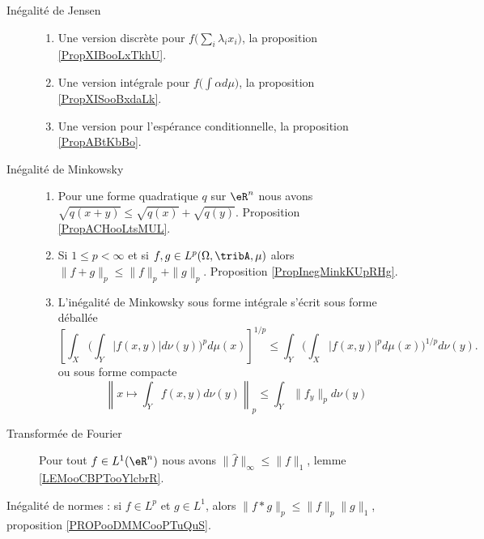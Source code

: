 \begin{description}
    \item[Inégalité de Jensen] 
        \begin{enumerate}
            \item
                Une version discrète pour \( f\big( \sum_i\lambda_ix_i \big)\), la proposition \ref{PropXIBooLxTkhU}.
            \item
                Une version intégrale pour \( f\big( \int \alpha d\mu \big)\), la proposition \ref{PropXISooBxdaLk}.
            \item
                Une version pour l'espérance conditionnelle, la proposition \ref{PropABtKbBo}.
        \end{enumerate}
    \item[Inégalité de Minkowsky]
        \begin{enumerate}
            \item
                Pour une forme quadratique \( q\) sur \( \eR^n\) nous avons $\sqrt{q(x+y)}\leq\sqrt{q(x)}+\sqrt{q(y)}$. Proposition \ref{PropACHooLtsMUL}.
            \item
                Si \( 1\leq p<\infty\) et si \( f,g\in L^p(\Omega,\tribA,\mu)\) alors \(  \| f+g \|_p\leq \| f \|_p+\| g \|_p\). Proposition \ref{PropInegMinkKUpRHg}.
            \item
                L'inégalité de Minkowsky sous forme intégrale s'écrit sous forme déballée
                \begin{equation}
                    \left[ \int_X\Big( \int_Y| f(x,y) |d\nu(y) \Big)^pd\mu(x) \right]^{1/p}\leq \int_Y\Big( \int_X| f(x,y) |^pd\mu(x) \Big)^{1/p}d\nu(y).
                \end{equation}
                ou sous forme compacte
                \begin{equation}
                    \left\|   x\mapsto\int_Y f(x,y)d\nu(y)   \right\|_p\leq \int_Y  \| f_y \|_pd\nu(y)
                \end{equation}
        \end{enumerate}
    \item[Transformée de Fourier]
        Pour tout \( f\in L^1(\eR^n)\) nous avons \( \| \hat f \|_{\infty}\leq \| f \|_1\), lemme \ref{LEMooCBPTooYlcbrR}.

\end{description}
        Inégalité de normes : si \( f\in L^p\) et \( g\in L^1\), alors \( \| f*g \|_p\leq \| f \|_p\| g \|_1\), proposition \ref{PROPooDMMCooPTuQuS}.

